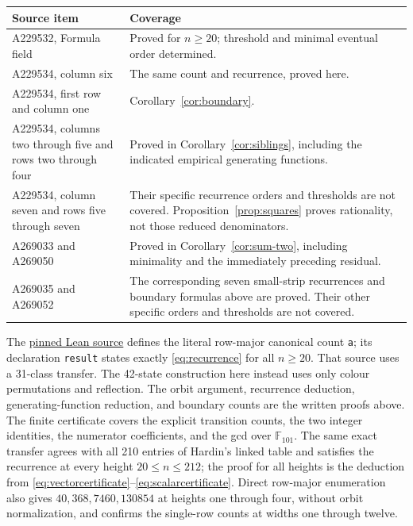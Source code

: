 \documentclass[11pt,a4paper]{article}
\begin{document}
\begin{center}
\small
\begin{tabular}{p{}p{}}
\toprule
Source item & Coverage\\
\midrule
A229532, Formula field & Proved for $n\geq20$; threshold and minimal
eventual order determined.\\
A229534, column six & The same count and recurrence, proved here.\\
A229534, first row and column one & Corollary~\ref{cor:boundary}.\\
A229534, columns two through five and rows two through four & Proved in
Corollary~\ref{cor:siblings}, including the indicated empirical generating functions.\\
A229534, column seven and rows five through seven & Their specific
recurrence orders and thresholds are not covered. Proposition~\ref{prop:squares}
proves rationality, not those reduced denominators.\\
A269033 and A269050 & Proved in Corollary~\ref{cor:sum-two}, including
minimality and the immediately preceding residual.\\
A269035 and A269052 & The corresponding seven small-strip recurrences
and boundary formulas above are proved. Their other specific orders
and thresholds are not covered.\\
\bottomrule
\end{tabular}
\end{center}

The \href{https://github.com/the-omega-institute/trureturing/blob/9849c0d81bfe0a953a10ad37400f5b1b61f028b5/D5/S3/StatisticalMechanics/Potts/CrossedStripDefectsWide/HardinA229532Strip.lean}{pinned Lean source}
defines the literal row-major canonical count \texttt{a}; its declaration
\texttt{result} states exactly
\eqref{eq:recurrence} for all $n\geq20$.
That source uses a 31-class transfer. The 42-state construction here
instead uses only colour permutations and reflection.
The orbit argument, recurrence deduction, generating-function reduction,
and boundary counts are the written proofs above. The finite certificate
covers the explicit transition counts, the two integer identities,
the numerator coefficients, and the gcd over $\mathbb F_{101}$.
The same exact transfer agrees with all 210 entries of Hardin's linked
table and satisfies the recurrence at every height $20\leq n\leq212$;
the proof for all heights is the deduction from
\eqref{eq:vectorcertificate}--\eqref{eq:scalarcertificate}.
Direct row-major enumeration also gives $40,368,7460,130854$ at heights
one through four, without orbit normalization, and confirms the single-row
counts at widths one through twelve.
\end{document}
